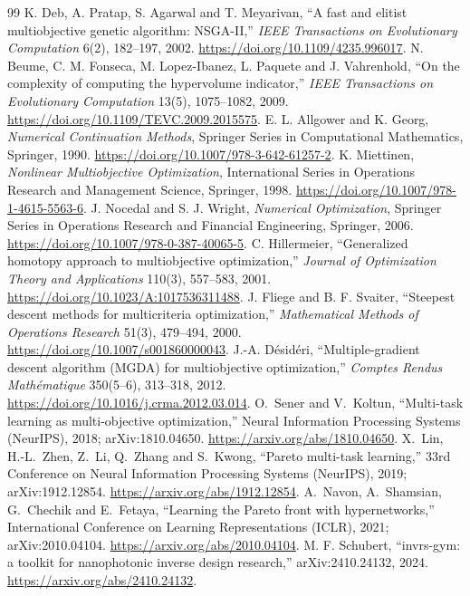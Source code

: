 \begin{thebibliography}{99}
 K. Deb, A. Pratap, S. Agarwal and T. Meyarivan, ``A fast and elitist multiobjective genetic algorithm: NSGA-II,'' \emph{IEEE Transactions on Evolutionary Computation} 6(2), 182--197, 2002. \url{https://doi.org/10.1109/4235.996017}.
 N. Beume, C. M. Fonseca, M. Lopez-Ibanez, L. Paquete and J. Vahrenhold, ``On the complexity of computing the hypervolume indicator,'' \emph{IEEE Transactions on Evolutionary Computation} 13(5), 1075--1082, 2009. \url{https://doi.org/10.1109/TEVC.2009.2015575}.
 E. L. Allgower and K. Georg, \emph{Numerical Continuation Methods}, Springer Series in Computational Mathematics, Springer, 1990. \url{https://doi.org/10.1007/978-3-642-61257-2}.
 K. Miettinen, \emph{Nonlinear Multiobjective Optimization}, International Series in Operations Research and Management Science, Springer, 1998. \url{https://doi.org/10.1007/978-1-4615-5563-6}.
 J. Nocedal and S. J. Wright, \emph{Numerical Optimization}, Springer Series in Operations Research and Financial Engineering, Springer, 2006. \url{https://doi.org/10.1007/978-0-387-40065-5}.
 C. Hillermeier, ``Generalized homotopy approach to multiobjective optimization,'' \emph{Journal of Optimization Theory and Applications} 110(3), 557--583, 2001. \url{https://doi.org/10.1023/A:1017536311488}.
 J. Fliege and B. F. Svaiter, ``Steepest descent methods for multicriteria optimization,'' \emph{Mathematical Methods of Operations Research} 51(3), 479--494, 2000. \url{https://doi.org/10.1007/s001860000043}.
 J.-A. D\'esid\'eri, ``Multiple-gradient descent algorithm (MGDA) for multiobjective optimization,'' \emph{Comptes Rendus Math\'ematique} 350(5--6), 313--318, 2012. \url{https://doi.org/10.1016/j.crma.2012.03.014}.
 O.~Sener and V.~Koltun, ``Multi-task learning as multi-objective optimization,'' Neural Information Processing Systems (NeurIPS), 2018; arXiv:1810.04650. \url{https://arxiv.org/abs/1810.04650}.
 X.~Lin, H.-L.~Zhen, Z.~Li, Q.~Zhang and S.~Kwong, ``Pareto multi-task learning,'' 33rd Conference on Neural Information Processing Systems (NeurIPS), 2019; arXiv:1912.12854. \url{https://arxiv.org/abs/1912.12854}.
 A.~Navon, A.~Shamsian, G.~Chechik and E.~Fetaya, ``Learning the Pareto front with hypernetworks,'' International Conference on Learning Representations (ICLR), 2021; arXiv:2010.04104. \url{https://arxiv.org/abs/2010.04104}.
 M. F. Schubert, ``invrs-gym: a toolkit for nanophotonic inverse design research,'' arXiv:2410.24132, 2024. \url{https://arxiv.org/abs/2410.24132}.

\end{thebibliography}
